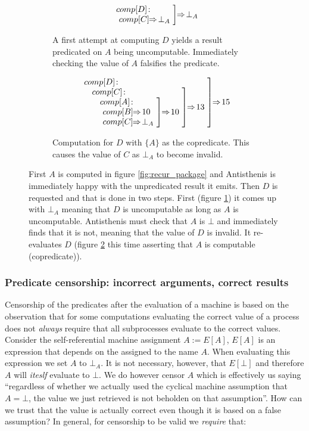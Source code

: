 \begin{figure}[H]
  \begin{subfigure}{0.4\linewidth}
    \[
      \comp{\bot_A}{D}{comp[C] \ev \bot_A}
    \]
    \caption{\label{fig:compdnaive}A first attempt at computing \(D\)
      yields a result predicated on \(A\) being
      uncomputable. Immediately checking the value of \(A\) falsifies
      the predicate.}
  \end{subfigure}
  \begin{subfigure}{0.4\linewidth}
    \[
    \comp{15}{D}{
      \comp{13}{C}{
        \comp{10}{A}{
          comp[B] \ev 10 \\
          \ comp[C] \ev \bot_A}}}
  \]
  \caption{\label{fig:compdsmart}Computation for \(D\) with \(\{A\}\)
    as the copredicate. This causes the value of \(C\) as \(\bot_A\)
    to become invalid.}
  \end{subfigure}
  \caption{\label{fig:correct} First \(A\) is computed in figure
    \ref{fig:recur_package} and Antisthenis is immediately happy with
    the unpredicated result it emits. Then \(D\) is requested and that
    is done in two steps. First (figure \ref{fig:compdnaive}) it comes
    up with \(\bot_A\) meaning that \(D\) is uncomputable as long as
    \(A\) is uncomputable. Antisthenis must check that \(A\) is
    \(\bot\) and immediately finds that it is not, meaning that the
    value of \(D\) is invalid. It re-evaluates \(D\) (figure
    \ref{fig:compdsmart} this time asserting that \(A\) is computable
    (copredicate)).}
\end{figure}

\subsubsection{Predicate censorship: incorrect arguments, correct
  results}

Censorship of the predicates after the evaluation of a machine is
based on the observation that for some computations evaluating the
correct value of a process does not \emph{always} require that all
subprocesses evaluate to the correct values. Consider the
self-referential machine assignment \(A := E[A]\), \(E[A]\) is an
expression that depends on the assigned to the name \(A\). When
evaluating this expression we set \(A\) to \(\bot_A\). It is not
necessary, however, that \(E[\bot]\) and therefore \(A\) will
\emph{iteslf} evaluate to \(\bot\). We do however censor \(A\) which
is effectively us saying ``regardless of whether we actually used the
cyclical machine assumption that \(A = \bot\), the value we just
retrieved is not beholden on that assumption''. How can we trust that
the value is actually correct even though it is based on a false
assumption? In general, for censorship to be valid we \emph{require}
that:

